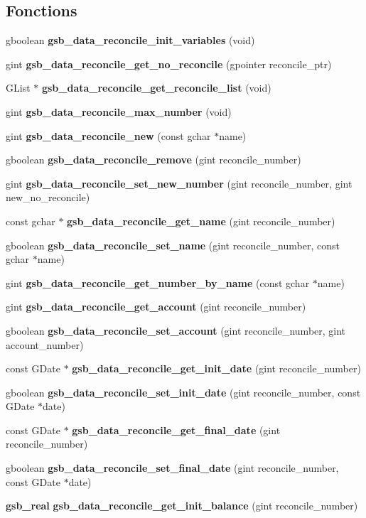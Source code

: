 \subsection*{Fonctions}
\begin{DoxyCompactItemize}
\item 
gboolean {\bf gsb\_\-data\_\-reconcile\_\-init\_\-variables} (void)
\item 
gint {\bf gsb\_\-data\_\-reconcile\_\-get\_\-no\_\-reconcile} (gpointer reconcile\_\-ptr)
\item 
GList $\ast$ {\bf gsb\_\-data\_\-reconcile\_\-get\_\-reconcile\_\-list} (void)
\item 
gint {\bf gsb\_\-data\_\-reconcile\_\-max\_\-number} (void)
\item 
gint {\bf gsb\_\-data\_\-reconcile\_\-new} (const gchar $\ast$name)
\item 
gboolean {\bf gsb\_\-data\_\-reconcile\_\-remove} (gint reconcile\_\-number)
\item 
gint {\bf gsb\_\-data\_\-reconcile\_\-set\_\-new\_\-number} (gint reconcile\_\-number, gint new\_\-no\_\-reconcile)
\item 
const gchar $\ast$ {\bf gsb\_\-data\_\-reconcile\_\-get\_\-name} (gint reconcile\_\-number)
\item 
gboolean {\bf gsb\_\-data\_\-reconcile\_\-set\_\-name} (gint reconcile\_\-number, const gchar $\ast$name)
\item 
gint {\bf gsb\_\-data\_\-reconcile\_\-get\_\-number\_\-by\_\-name} (const gchar $\ast$name)
\item 
gint {\bf gsb\_\-data\_\-reconcile\_\-get\_\-account} (gint reconcile\_\-number)
\item 
gboolean {\bf gsb\_\-data\_\-reconcile\_\-set\_\-account} (gint reconcile\_\-number, gint account\_\-number)
\item 
const GDate $\ast$ {\bf gsb\_\-data\_\-reconcile\_\-get\_\-init\_\-date} (gint reconcile\_\-number)
\item 
gboolean {\bf gsb\_\-data\_\-reconcile\_\-set\_\-init\_\-date} (gint reconcile\_\-number, const GDate $\ast$date)
\item 
const GDate $\ast$ {\bf gsb\_\-data\_\-reconcile\_\-get\_\-final\_\-date} (gint reconcile\_\-number)
\item 
gboolean {\bf gsb\_\-data\_\-reconcile\_\-set\_\-final\_\-date} (gint reconcile\_\-number, const GDate $\ast$date)
\item 
{\bf gsb\_\-real} {\bf gsb\_\-data\_\-reconcile\_\-get\_\-init\_\-balance} (gint reconcile\_\-number)

\end{DoxyCompactItemize}

